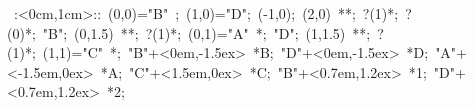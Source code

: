 
\hbox{
\xy    <1cm,0cm>:<0cm,1cm>::
       (0,0)="B" ; (1,0)="D"; (-1,0); (2,0) **\dir{-};  ?(1)*\dir{>};  ?(0)*\dir{<}; 
       "B"; (0,1.5) **\dir{-};  ?(1)*\dir{>}; (0,1)="A" *{\bullet};
       "D"; (1,1.5) **\dir{-};  ?(1)*\dir{>}; (1,1)="C" *{\bullet};
       "B"+<0em,-1.5ex> *{B};
       "D"+<0em,-1.5ex> *{D};
       "A"+<-1.5em,0ex> *{A};
       "C"+<1.5em,0ex> *{C};
       "B"+<0.7em,1.2ex> *{1};
       "D"+<0.7em,1.2ex> *{2};
       \endxy}
	   
